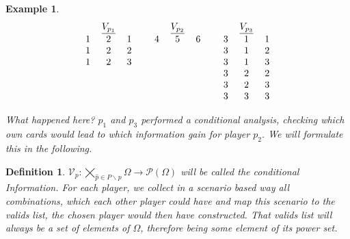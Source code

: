 \documentclass{article}
\newtheorem{definition}{Definition}[section]
\newtheorem{example}{Example}[section]
\begin{document}
\begin{example}
\[
\begin{tabular}{ccccccccccc}
& $\underline{V_{p_1}}$ & & & & $\underline{V_{p_2}}$ & & & & $\underline{V_{p_3}}$ & \\
1 & 2 & 1 & & 4 & 5 & 6 & & 3 & 1 & 1 \\
1 & 2 & 2 & &   &   &   & & 3 & 1 & 2 \\
1 & 2 & 3 & &   &   &   & & 3 & 1 & 3 \\
  &   &   & &   &   &   & & 3 & 2 & 2 \\
  &   &   & &   &   &   & & 3 & 2 & 3 \\
  &   &   & &   &   &   & & 3 & 3 & 3 \\
\end{tabular}
\]

What happened here? $p_1$ and $p_3$ performed a conditional analysis, checking which own cards would lead to which information gain for player $p_2$. We will formulate this in the following.

\end{example}

\begin{definition}

$\mathcal{V}_p: \bigtimes_{\hat{p} \in P \backslash p} \Omega \longrightarrow \mathcal{P}(\Omega)$ will be called the conditional Information. For each player, we collect in a scenario based way all combinations, which each other player could have and map this scenario to the valids list, the chosen player would then have constructed. That valids list will always be a set of elements of $\Omega$, therefore being some element of its power set.

\end{definition}
\end{document}
